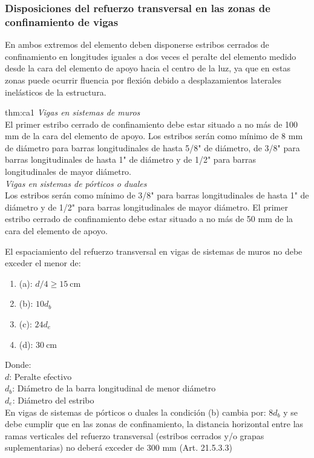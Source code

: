 \subsubsection{Disposiciones del refuerzo transversal en las zonas de confinamiento de vigas}
En ambos extremos del elemento deben disponerse estribos cerrados de confinamiento en longitudes iguales a dos veces el peralte del elemento medido desde la cara del elemento de apoyo hacia el centro de la luz, ya que en estas zonas puede ocurrir fluencia por flexión debido a desplazamientos laterales inelásticos de la estructura.
\begin{theo}[Art. 21.4.4.4 y 21.5.3.2 :]{thm:ca1}
\textit{Vigas en sistemas de muros}\\
El primer estribo cerrado de confinamiento debe estar situado a no más de 100 mm de la cara del elemento de apoyo.  Los estribos serán como mínimo de 8 mm de diámetro para barras longitudinales de hasta 5/8" de diámetro, de 3/8" para barras longitudinales de hasta  1" de diámetro y de 1/2" para barras longitudinales de mayor diámetro. \\
\textit{Vigas en sistemas de pórticos o duales}\\
Los estribos serán como mínimo de 3/8" para barras longitudinales de hasta 1" de diámetro y de  1/2"  para  barras  longitudinales  de  mayor  diámetro. El primer  estribo  cerrado  de confinamiento debe estar situado a no más de 50 mm de la cara del elemento de apoyo.
\end{theo}
\newpage
\noindent El espaciamiento del refuerzo transversal en vigas de sistemas de muros no debe exceder el menor de:
\begin{enumerate}
\item[] (a): $d / 4 \geq 15 \mathrm{~cm}$
\item[] (b): $10d_{b}$
\item[] (c): $24d_{e}$
\item[] (d): $30 \mathrm{~cm}$
\end{enumerate}
\noindent
Donde:\\
$d$: Peralte efectivo\\
$d_{b}$: Diámetro de la barra longitudinal de menor diámetro\\
$d_{e}$: Diámetro del estribo\\
En vigas de sistemas de pórticos o duales la condición (b) cambia por: $8d_{b}$ y se debe cumplir que en las zonas de confinamiento, la distancia horizontal entre las ramas verticales del refuerzo transversal (estribos cerrados y/o grapas suplementarias) no deberá exceder de 300 mm (Art. 21.5.3.3)\\
